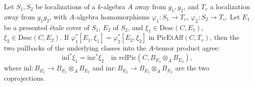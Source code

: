 \begin{theorem}
  \label{pa-thm:PicEtAff_pair_condition}
  \leanok

  Let \(S_1, S_2\) be localizations of a \(k\)-algebra \(A\) away from \(g_1, g_2\), and \(T_v\) a
  localization away from \(g_1 g_2\), with \(A\)-algebra homomorphisms \(\varphi_1 \colon S_1 \to
  T_v\), \(\varphi_2 \colon S_2 \to T_v\). Let \(E_1\) be a presented \'etale cover of \(S_1\),
  \(E_2\) of \(S_2\), and \(\xi_1 \in \mathrm{Desc}(C, E_1)\), \(\xi_2 \in \mathrm{Desc}(C, E_2)\).
  If \(\varphi_1^{*}[E_1, \xi_1] = \varphi_2^{*}[E_2, \xi_2]\) in \(\mathrm{PicEtAff}(C, T_v)\), then
  the two pullbacks of the underlying classes into the \(A\)-tensor product agree:
  \[
    \mathrm{inl}^{*}\xi_1 = \mathrm{inr}^{*}\xi_2 \quad\text{in } \mathrm{relPic}(C, B_{E_1}
    \otimes_A B_{E_2}),
  \]
  where \(\mathrm{inl} \colon B_{E_1} \to B_{E_1} \otimes_A B_{E_2}\) and \(\mathrm{inr} \colon
  B_{E_2} \to B_{E_1} \otimes_A B_{E_2}\) are the two coprojections.
\end{theorem}
